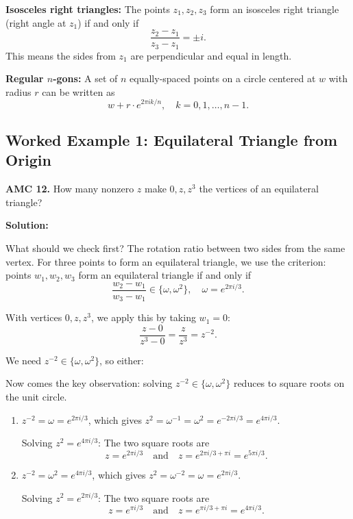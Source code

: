 \documentclass[12pt]{extarticle}
\begin{document}
\textbf{Isosceles right triangles:} The points $z_1, z_2, z_3$ form an isosceles right triangle (right angle at $z_1$) if and only if
\[
\frac{z_2 - z_1}{z_3 - z_1} = \pm i.
\]
This means the sides from $z_1$ are perpendicular and equal in length.

\textbf{Regular $n$-gons:} A set of $n$ equally-spaced points on a circle centered at $w$ with radius $r$ can be written as
\[
w + r \cdot e^{2\pi ik/n}, \quad k = 0, 1, \ldots, n-1.
\]

\subsection*{Worked Example 1: Equilateral Triangle from Origin}

\begin{examplebox}
\textbf{AMC 12.} How many nonzero $z$ make $0, z, z^3$ the vertices of an equilateral triangle?
\end{examplebox}

\textbf{Solution:}

What should we check first? The rotation ratio between two sides from the same vertex.
For three points to form an equilateral triangle, we use the criterion: points $w_1, w_2, w_3$ form an equilateral triangle if and only if
\[
\frac{w_2 - w_1}{w_3 - w_1} \in \{\omega, \omega^2\}, \quad \omega = e^{2\pi i/3}.
\]

With vertices $0, z, z^3$, we apply this by taking $w_1 = 0$:
\[
\frac{z - 0}{z^3 - 0} = \frac{z}{z^3} = z^{-2}.
\]

We need $z^{-2} \in \{\omega, \omega^2\}$, so either:

Now comes the key observation: solving $z^{-2} \in \{\omega,\omega^2\}$ reduces to square roots on the unit circle.

\begin{enumerate}
\item $z^{-2} = \omega = e^{2\pi i/3}$, which gives $z^2 = \omega^{-1} = \omega^2 = e^{-2\pi i/3} = e^{4\pi i/3}$.

Solving $z^2 = e^{4\pi i/3}$: The two square roots are
\[
z = e^{2\pi i/3} \quad \text{and} \quad z = e^{2\pi i/3 + \pi i} = e^{5\pi i/3}.
\]

\item $z^{-2} = \omega^2 = e^{4\pi i/3}$, which gives $z^2 = \omega^{-2} = \omega = e^{2\pi i/3}$.

Solving $z^2 = e^{2\pi i/3}$: The two square roots are
\[
z = e^{\pi i/3} \quad \text{and} \quad z = e^{\pi i/3 + \pi i} = e^{4\pi i/3}.
\]

\end{enumerate}
\end{document}

